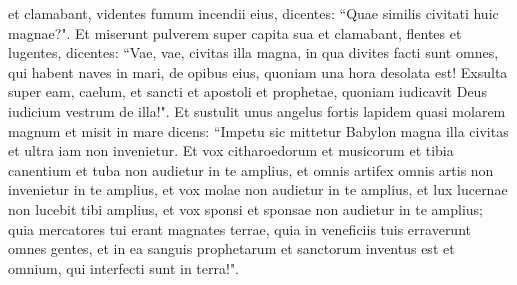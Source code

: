 \begin{biblechapter}
\verse et clamabant, videntes fumum incendii eius, dicentes: “Quae similis civitati huic magnae?". 
\verse Et miserunt pulverem super capita sua et clamabant, flentes et lugentes, dicentes: “Vae, vae, civitas illa magna, in qua divites facti sunt omnes, qui habent naves in mari, de opibus eius, quoniam una hora desolata est! 
\verse Exsulta super eam, caelum, et sancti et apostoli et prophetae, quoniam iudicavit Deus iudicium vestrum de illa!". 
\verse Et sustulit unus angelus fortis lapidem quasi molarem magnum et misit in mare dicens: “Impetu sic mittetur Babylon magna illa civitas et ultra iam non invenietur. 
\verse Et vox citharoedorum et musicorum et tibia canentium et tuba non audietur in te amplius, et omnis artifex omnis artis non invenietur in te amplius, et vox molae non audietur in te amplius, 
\verse et lux lucernae non lucebit tibi amplius, et vox sponsi et sponsae non audietur in te amplius; quia mercatores tui erant magnates terrae, quia in veneficiis tuis erraverunt omnes gentes, 
\verse et in ea sanguis prophetarum et sanctorum inventus est et omnium, qui interfecti sunt in terra!". 
\end{biblechapter}

